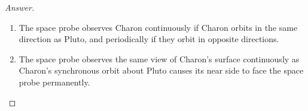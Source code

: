 \begin{proof}[Answer] \
\begin{enumerate}[label=(\roman*)]
\item The space probe observes Charon continuously if Charon orbits in the same direction as Pluto, and periodically if they orbit in opposite directions.
\item The space probe observes the same view of Charon's surface continuously as Charon's synchronous orbit about Pluto causes its near side to face the space probe permanently.
\end{enumerate}
\end{proof}
\pagebreak